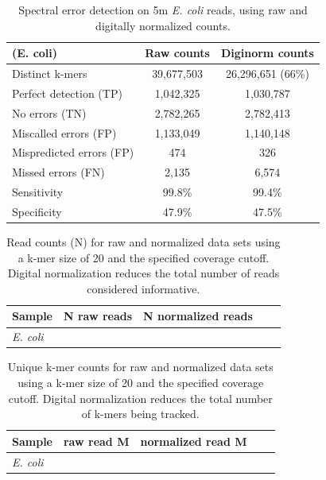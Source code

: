 \documentclass{article}
\begin{document}

\begin{table}
\begin{tabular}{|l|c|c|}
\hline
(E. coli) & Raw counts & Diginorm counts \\
\hline
Distinct k-mers         & 39,677,503 & 26,296,651 (66\%) \\
\hline
Perfect detection (TP)  & 1,042,325 & 1,030,787 \\
No errors (TN)          & 2,782,265 & 2,782,413 \\
Miscalled errors (FP)   & 1,133,049 & 1,140,148 \\
Mispredicted errors (FP)& 474       & 326       \\
Missed errors (FN)      & 2,135     & 6,574     \\
\hline
Sensitivity & 99.8\% & 99.4\% \\
Specificity & 47.9\% & 47.5\% \\
\hline
\end{tabular}

\caption{Spectral error detection on 5m {\em E. coli} reads, using raw and
  digitally normalized counts.}
\label{tab:ecoli_dn_counts}
\end{table}

\begin{table}
\begin{tabular}{|l|c|c|c|c|}
\hline
Sample              & N raw reads & N normalized reads \\
\hline
{\em E. coli}       &            & \\
\hline
\end{tabular}

\caption{Read counts (N) for raw and normalized data sets using a
  k-mer size of 20 and the specified coverage cutoff. Digital
  normalization reduces the total number of reads considered
  informative.}
\label{tab:kmer_counts}
\end{table}

\begin{table}
\begin{tabular}{|l|c|c|c|c|}
\hline
Sample              & raw read M & normalized read M \\
\hline
{\em E. coli}       &            & \\
\hline
\end{tabular}

\caption{Unique k-mer counts for raw and normalized data sets using a
  k-mer size of 20 and the specified coverage cutoff.  Digital
  normalization reduces the total number of k-mers being tracked.}

\label{tab:streaming_counts}
\end{table}
\end{document}
